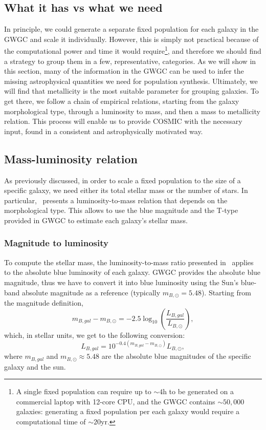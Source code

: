 \subsection{What it has vs what we need}
In principle, we could generate a separate fixed population for each galaxy in the GWGC and scale it individually.
However, this is simply not practical because of the computational power and time it would require\footnote{A single fixed population can require up to $\sim4$h to be generated {on a commercial laptop with 12-core CPU}, and the GWGC contains $\sim50,000$ galaxies: generating a fixed population per each galaxy would require a computational time of $\sim20$yr.}, and therefore we should find a strategy to group them in a few, representative, categories.
As we will show in this section, many of the information in the GWGC can be used to infer the missing astrophysical quantities we need for population synthesis. 
Ultimately, we will find that metallicity is the most suitable parameter for grouping galaxies.
To get there, we follow a chain of empirical relations, starting from the galaxy morphological type, through  a luminosity to mass, and then a mass to metallicity relation. 
This process will enable us to provide COSMIC with the necessary input, found in a consistent and astrophysically motivated way.



\subsection{Mass-luminosity relation}

As previously discussed, in order to scale a fixed population to the size of a specific galaxy, we need either its total stellar mass or the number of stars.
In particular,~\cite{Faber&Gallagher} presents a luminosity-to-mass relation that depends on the morphological type.
This allows to use the blue magnitude and the T-type provided in GWGC to estimate each galaxy's stellar mass.

\subsubsection{Magnitude to luminosity}
To compute the stellar mass, the luminosity-to-mass ratio presented in~\cite{Faber&Gallagher} applies to the absolute blue luminosity of each galaxy.
GWGC provides the absolute blue magnitude, thus we have to convert it into blue luminosity using the Sun's blue-band absolute magnitude as a reference (typically $m_{B,\odot} = 5.48$).
Starting from the magnitude definition,
\[
    m_{B,gal} - m_{B,\odot} = -2.5\log_{10}\left(\frac{L_{B,gal}}{L_{B,\odot}}\right),
\]
which, in stellar units, we get to the following conversion:
\begin{equation}
    L_{B,gal} = 10^{-0.4(m_{B,gal}-m_{B,\odot})}L_{B,\odot},
    \label{eq: magnitude to luminosity}
\end{equation}
where $m_{B,gal}$ and $m_{B,\odot}\approx 5.48$ are the absolute blue magnitudes of the specific galaxy and the sun.

